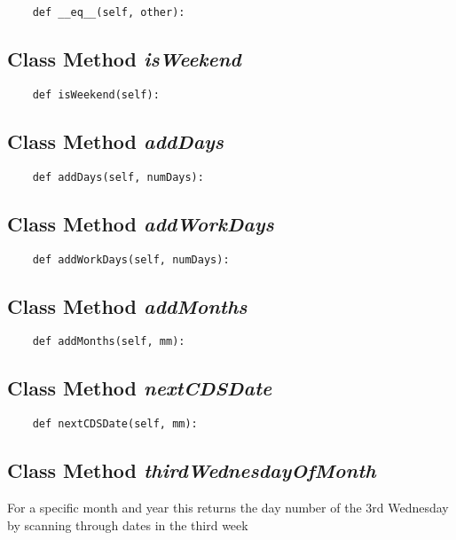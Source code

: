 \documentclass[twoside,11pt]{book}
\begin{document}
\begin{lstlisting}
    def __eq__(self, other):
\end{lstlisting}

\subsection{Class Method {\it isWeekend}}


\begin{lstlisting}
    def isWeekend(self):
\end{lstlisting}

\subsection{Class Method {\it addDays}}


\begin{lstlisting}
    def addDays(self, numDays):
\end{lstlisting}

\subsection{Class Method {\it addWorkDays}}


\begin{lstlisting}
    def addWorkDays(self, numDays):
\end{lstlisting}

\subsection{Class Method {\it addMonths}}


\begin{lstlisting}
    def addMonths(self, mm):
\end{lstlisting}

\subsection{Class Method {\it nextCDSDate}}


\begin{lstlisting}
    def nextCDSDate(self, mm):
\end{lstlisting}

\subsection{Class Method {\it thirdWednesdayOfMonth}}
For a specific month and year this returns the day number of the 3rd Wednesday by scanning through dates in the third week 
\end{document}
